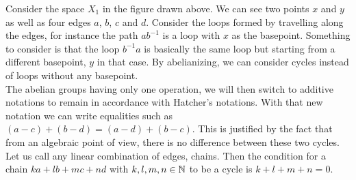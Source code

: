 \documentclass[12pt, a4paper]{article}
\begin{document}
\begin{center}
\end{center}

Consider the space $X_1$ in the figure drawn above. We can see two points $x$ and $y$ as well as four edges $a$, $b$, $c$ and $d$. Consider the loops formed by travelling along the edges, for instance the path $ab^{-1}$ is a loop with $x$ as the basepoint. Something to consider is that the loop $b^{-1}a$ is basically the same loop but starting from a different basepoint, $y$ in that case. By abelianizing, we can consider cycles instead of loops without any basepoint.\\

The abelian groups having only one operation, we will then switch to additive notations to remain in accordance with Hatcher's notations. With that new notation we can write equalities such as $(a-c) + (b-d) = (a-d) + (b-c)$. This is justified by the fact that from an algebraic point of view, there is no difference between these two cycles.\\

Let us call any linear combination of edges, chains. Then the condition for a chain $ka + lb + mc + nd$ with $k,l,m,n \in \mathbb{N}$ to be a cycle is $k + l + m + n = 0$.\\
\end{document}

